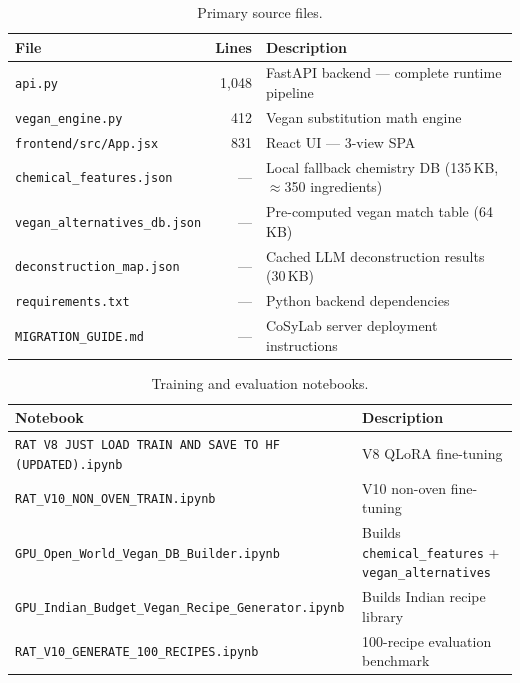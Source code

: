 \documentclass[12pt, a4paper]{article}
\begin{document}
\begin{table}[H]
\centering
\caption{Primary source files.}
\begin{tabularx}{\textwidth}{l r X}
\toprule
\textbf{File} & \textbf{Lines} & \textbf{Description} \\
\midrule
\texttt{api.py}                     & 1,048 & FastAPI backend --- complete runtime pipeline \\
\texttt{vegan\_engine.py}           & 412   & Vegan substitution math engine \\
\texttt{frontend/src/App.jsx}       & 831   & React UI --- 3-view SPA \\
\texttt{chemical\_features.json}    & ---   & Local fallback chemistry DB (135\,KB, $\approx$350 ingredients) \\
\texttt{vegan\_alternatives\_db.json} & --- & Pre-computed vegan match table (64\,KB) \\
\texttt{deconstruction\_map.json}   & ---   & Cached LLM deconstruction results (30\,KB) \\
\texttt{requirements.txt}           & ---   & Python backend dependencies \\
\texttt{MIGRATION\_GUIDE.md}        & ---   & CoSyLab server deployment instructions \\
\bottomrule
\end{tabularx}
\end{table}

\begin{table}[H]
\centering
\caption{Training and evaluation notebooks.}
\begin{tabularx}{\textwidth}{l X}
\toprule
\textbf{Notebook} & \textbf{Description} \\
\midrule
\texttt{RAT V8 JUST LOAD TRAIN AND SAVE TO HF (UPDATED).ipynb} & V8 QLoRA fine-tuning \\
\texttt{RAT\_V10\_NON\_OVEN\_TRAIN.ipynb}                       & V10 non-oven fine-tuning \\
\texttt{GPU\_Open\_World\_Vegan\_DB\_Builder.ipynb}             & Builds \texttt{chemical\_features} + \texttt{vegan\_alternatives} \\
\texttt{GPU\_Indian\_Budget\_Vegan\_Recipe\_Generator.ipynb}    & Builds Indian recipe library \\
\texttt{RAT\_V10\_GENERATE\_100\_RECIPES.ipynb}                 & 100-recipe evaluation benchmark \\
\bottomrule
\end{tabularx}
\end{table}
\end{document}
